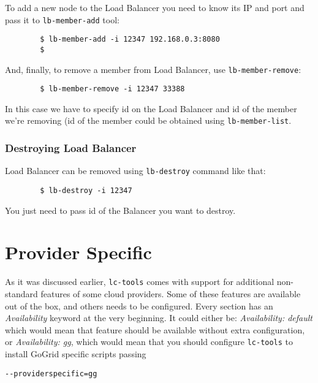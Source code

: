 \documentclass[a4paper]{report}
\begin{document}
                 To add a new node to the Load Balancer you need to know its IP and port and pass it to \texttt{lb-member-add}
                 tool:

                 \begin{verbatim}
		$ lb-member-add -i 12347 192.168.0.3:8080
		$
                 \end{verbatim}

                 And, finally, to remove a member from Load Balancer, use \texttt{lb-member-remove}:

                 \begin{verbatim}
		$ lb-member-remove -i 12347 33388
                 \end{verbatim}

                 In this case we have to specify id on the Load Balancer and id of the member we're removing (id of
                 the member could be obtained using \texttt{lb-member-list}.

                 \subsubsection{Destroying Load Balancer}
                 Load Balancer can be removed using \texttt{lb-destroy} command like that:

                 \begin{verbatim}
		$ lb-destroy -i 12347
                 \end{verbatim}

                 You just need to pass id of the Balancer you want to destroy.

\section{Provider Specific} \label{provspec}

As it was discussed earlier, {\tt lc-tools} comes with support for additional
non-standard features of some cloud providers. Some of these features are available
out of the box, and others needs to be configured. Every section has an
\textit{Availability} keyword at the very beginning. It could either be:
\textit{Availability: default} which would mean that feature should be available
without extra configuration, or \textit{Availability: gg}, which would mean
that you should configure {\tt lc-tools} to install GoGrid specific scripts passing

\begin{verbatim}
--providerspecific=gg
\end{verbatim}
\end{document}
